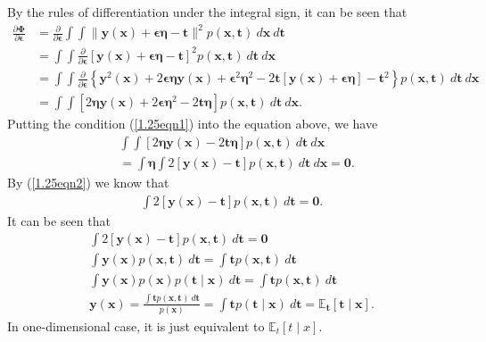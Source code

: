 \begin{answer}{}
	By the rules of differentiation under the integral sign, it can be seen that
	\begin{align}
		\frac{\partial \bm{\Phi}}{\partial \bm{\epsilon}} &= \frac{\partial}{\partial \bm{\epsilon}} \int\int \lVert \bm{y}(\bm{x}) + \bm{\epsilon}\bm{\eta} - \bm{t} \rVert^2 p(\bm{x}, \bm{t})\ d\bm{x}\ d\bm{t}\\
		&= \int\int \frac{\partial}{\partial \bm{\epsilon}}\left[ \bm{y}(\bm{x}) + \bm{\epsilon}\bm{\eta} - \bm{t} \right]^2 p(\bm{x}, \bm{t})\ d\bm{t}\ d\bm{x}\\
		&= \int\int \frac{\partial}{\partial \bm{\epsilon}}\left\{ \bm{y}^2(\bm{x}) + 2\bm{\epsilon}\bm{\eta}\bm{y}(\bm{x}) + \bm{\epsilon}^2\bm{\eta}^2 - 2\bm{t}\left[ \bm{y}(\bm{x}) + \bm{\epsilon}\bm{\eta}\right]  - \bm{t}^2\right\} p(\bm{x}, \bm{t})\ d\bm{t}\ d\bm{x}\\
		&= \int\int \left[2\bm{\eta}\bm{y}(\bm{x}) + 2\bm{\epsilon}\bm{\eta}^2 - 2\bm{t}\bm{\eta}\right] p(\bm{x}, \bm{t})\ d\bm{t}\ d\bm{x}.
	\end{align}
	Putting the condition (\ref{1.25eqn1}) into the equation above, we have
	\begin{align}
		&\int\int \left[2\bm{\eta}\bm{y}(\bm{x}) - 2\bm{t}\bm{\eta}\right] p(\bm{x}, \bm{t})\ d\bm{t}\ d\bm{x}\\
		&= \int \bm{\eta}\int 2\left[\bm{y}(\bm{x}) - \bm{t} \right]p(\bm{x}, \bm{t})\ d\bm{t}\ d\bm{x} = \bm{0}.
	\end{align}
	By (\ref{1.25eqn2}) we know that
	\begin{align}
		\int 2\left[\bm{y}(\bm{x}) - \bm{t} \right]p(\bm{x}, \bm{t})\ d\bm{t} = \bm{0}. 
	\end{align}
	It can be seen that
	\begin{gather}
		\int 2\left[\bm{y}(\bm{x}) - \bm{t} \right]p(\bm{x}, \bm{t})\ d\bm{t} = \bm{0}\\
		\int \bm{y}(\bm{x}) p(\bm{x}, \bm{t})\ d\bm{t} = \int \bm{t} p(\bm{x}, \bm{t})\ d\bm{t}\\
		\int \bm{y}(\bm{x}) p(\bm{x}) p(\bm{t} \mid \bm{x})\ d\bm{t} = \int \bm{t} p(\bm{x}, \bm{t})\ d\bm{t}\\
		\bm{y}(\bm{x}) = \frac{\int \bm{t} p(\bm{x}, \bm{t})\ d\bm{t}}{p(\bm{x})} = \int \bm{t} p(\bm{t} \mid \bm{x})\ d\bm{t} = \mathbb{E}_{\bm{t}}\left[\bm{t} \mid \bm{x}\right].
	\end{gather}
	In one-dimensional case, it is just equivalent to $\mathbb{E}_{t}\left[t \mid x\right]$.
\end{answer}